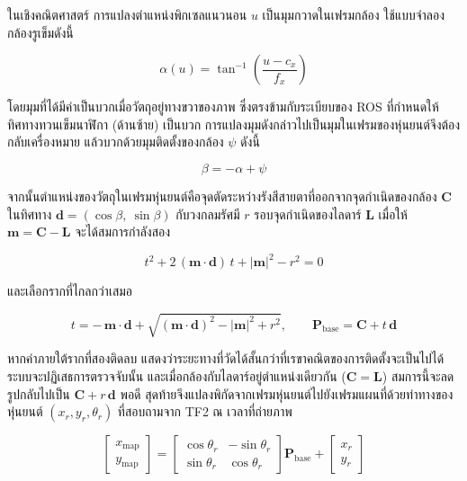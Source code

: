 \documentclass[a4paper,12pt]{report}
\begin{document}
ในเชิงคณิตศาสตร์ การแปลงตำแหน่งพิกเซลแนวนอน $u$ เป็นมุมกวาดในเฟรมกล้อง
ใช้แบบจำลองกล้องรูเข็มดังนี้

\begin{equation}
\alpha(u) = \tan^{-1}\!\left(\frac{u - c_x}{f_x}\right)
\end{equation}

โดยมุมที่ได้มีค่าเป็นบวกเมื่อวัตถุอยู่ทางขวาของภาพ
ซึ่งตรงข้ามกับระเบียบของ ROS ที่กำหนดให้ทิศทางทวนเข็มนาฬิกา (ด้านซ้าย) เป็นบวก
การแปลงมุมดังกล่าวไปเป็นมุมในเฟรมของหุ่นยนต์จึงต้องกลับเครื่องหมาย
แล้วบวกด้วยมุมติดตั้งของกล้อง $\psi$ ดังนี้

\begin{equation}
\beta = -\alpha + \psi
\end{equation}

จากนั้นตำแหน่งของวัตถุในเฟรมหุ่นยนต์คือจุดตัดระหว่างรังสีสายตาที่ออกจากจุดกำเนิดของกล้อง
$\mathbf{C}$ ในทิศทาง $\mathbf{d} = (\cos\beta,\ \sin\beta)$
กับวงกลมรัศมี $r$ รอบจุดกำเนิดของไลดาร์ $\mathbf{L}$
เมื่อให้ $\mathbf{m} = \mathbf{C} - \mathbf{L}$ จะได้สมการกำลังสอง

\begin{equation}
t^2 + 2\,(\mathbf{m}\cdot\mathbf{d})\,t + |\mathbf{m}|^2 - r^2 = 0
\end{equation}

และเลือกรากที่ไกลกว่าเสมอ

\begin{equation}
t = -\,\mathbf{m}\cdot\mathbf{d} + \sqrt{(\mathbf{m}\cdot\mathbf{d})^2 - |\mathbf{m}|^2 + r^2},
\qquad
\mathbf{P}_{\text{base}} = \mathbf{C} + t\,\mathbf{d}
\end{equation}

หากค่าภายใต้รากที่สองติดลบ แสดงว่าระยะทางที่วัดได้สั้นกว่าที่เรขาคณิตของการติดตั้งจะเป็นไปได้
ระบบจะปฏิเสธการตรวจจับนั้น และเมื่อกล้องกับไลดาร์อยู่ตำแหน่งเดียวกัน
($\mathbf{C} = \mathbf{L}$) สมการนี้จะลดรูปกลับไปเป็น $\mathbf{C} + r\,\mathbf{d}$ พอดี
สุดท้ายจึงแปลงพิกัดจากเฟรมหุ่นยนต์ไปยังเฟรมแผนที่ด้วยท่าทางของหุ่นยนต์
$(x_{r}, y_{r}, \theta_{r})$ ที่สอบถามจาก TF2 ณ เวลาที่ถ่ายภาพ

\begin{equation}
\begin{bmatrix} x_{\text{map}} \\ y_{\text{map}} \end{bmatrix}
=
\begin{bmatrix} \cos\theta_{r} & -\sin\theta_{r} \\
                \sin\theta_{r} & \cos\theta_{r} \end{bmatrix}
\mathbf{P}_{\text{base}}
+
\begin{bmatrix} x_{r} \\ y_{r} \end{bmatrix}
\end{equation}
\end{document}
